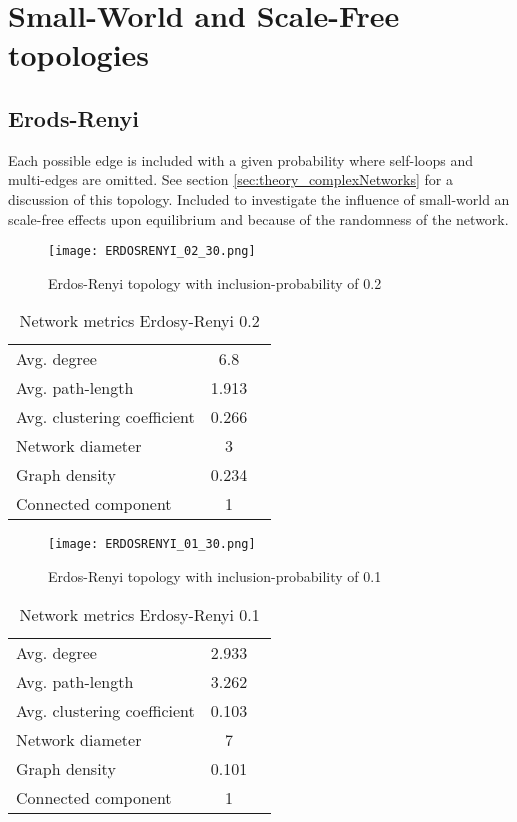 \documentclass[Bachelorarbeit.tex]{subfiles}
\begin{document}
\section{Small-World and Scale-Free topologies}
\subsection{Erods-Renyi}
Each possible edge is included with a given probability where self-loops and multi-edges are omitted. See section \ref{sec:theory_complexNetworks} for a discussion of this topology.
\medskip
Included to investigate the influence of small-world an scale-free effects upon equilibrium and because of the randomness of the network.

\begin{figure}[H]
	\centering
  \texttt{[image: ERDOSRENYI\_02\_30.png]}
	\caption{Erdos-Renyi topology with inclusion-probability of 0.2}
	\label{fig:topology_ERDOSRENYI_02_30}
\end{figure}

\begin{table}[h]
	\centering
	\caption{Network metrics Erdosy-Renyi 0.2}
	\begin{tabular} { l c r }
		\hline
		Avg. degree & 6.8 \\
		Avg. path-length & 1.913 \\
		Avg. clustering coefficient &  0.266 \\
		Network diameter & 3 \\
		Graph density & 0.234 \\
		Connected component & 1 \\
		\hline
	\end{tabular}
\end{table}

\begin{figure}[H]
	\centering
  \texttt{[image: ERDOSRENYI\_01\_30.png]}
	\caption{Erdos-Renyi topology with inclusion-probability of 0.1}
	\label{fig:topology_ERDOSRENYI_01_30}
\end{figure}

\begin{table}[h]
	\centering
	\caption{Network metrics Erdosy-Renyi 0.1}
	\begin{tabular} { l c r }
		\hline
		Avg. degree & 2.933 \\
		Avg. path-length & 3.262 \\
		Avg. clustering coefficient & 0.103 \\
		Network diameter & 7 \\
		Graph density & 0.101 \\
		Connected component & 1 \\
		\hline
	\end{tabular}
\end{table}
\end{document}
